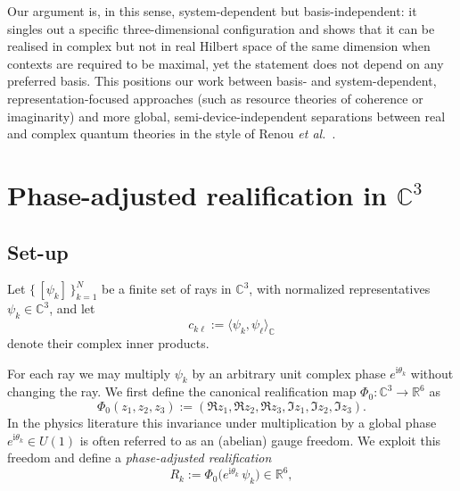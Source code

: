 \documentclass[%
  reprint,
  superscriptaddress,
  amsmath,amssymb,
  pra,
  floatfix,
  longbibliography
]{revtex4-2}
\begin{document}
Our argument is, in this sense, system-dependent but basis-independent: it
singles out a specific three-dimensional configuration and shows that it can
be realised in complex but not in real Hilbert space of the same dimension
when contexts are required to be maximal, yet the statement does not depend
on any preferred basis. This positions our work between basis- and
system-dependent, representation-focused approaches (such as resource
theories of coherence or imaginarity) and more global, semi-device-independent
separations between real and complex quantum theories in the style of
Renou \emph{et al.}~\cite{renou-2021}.



\section{Phase-adjusted realification in \texorpdfstring{$\mathbb{C}^3$}{C3}}

\subsection{Set-up}

Let $\{\,[\psi_k]\,\}_{k=1}^N$ be a finite set of rays in $\mathbb{C}^3$, with normalized representatives $\psi_k\in\mathbb{C}^3$, and let
\begin{equation}
  c_{k\ell} := \langle \psi_k,\psi_\ell\rangle_{\mathbb{C}}
\end{equation}
denote their complex inner products.

For each ray we may multiply $\psi_k$ by an arbitrary unit complex phase
$e^{\mathrm{i}\theta_k}$ without changing the ray. We first define the canonical realification map $\Phi_0: \mathbb{C}^3 \to \mathbb{R}^6$ as
\begin{equation}
  \Phi_0(z_1, z_2, z_3) := (\Re z_1, \Re z_2, \Re z_3, \Im z_1, \Im z_2, \Im z_3).
  \label{eq:phi0}
\end{equation}
In the physics literature this
invariance under multiplication by a global phase $e^{\mathrm{i}\theta_k}\in U(1)$
is often referred to as an (abelian) gauge freedom. We exploit this freedom
and define a \emph{phase-adjusted realification}
\begin{equation}
  R_k := \Phi_0\bigl( e^{\mathrm{i}\theta_k}\,\psi_k\bigr)\in\mathbb{R}^6,
\label{2025-rvc-padef}
\end{equation}
\end{document}
